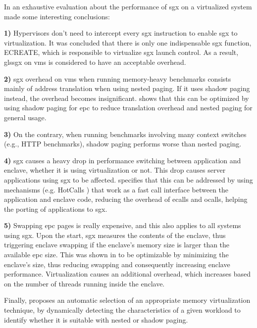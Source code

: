 In \cite{sgxVirtualizationPaper} an exhaustive evaluation about the performance of \gls{sgx} on a virtualized system made some interesting conclusions:

\textbf{1)} Hypervisors don't need to intercept every \gls{sgx} instruction to enable \gls{sgx} to virtualization. It was concluded that there is only one indispensable \gls{sgx} function, ECREATE, which is responsible to virtualize \gls{sgx} launch control. As a result, gls{sgx} on \gls{vm}s is considered to have an acceptable overhead.

\textbf{2)} \gls{sgx} overhead on \gls{vm}s when running memory-heavy benchmarks consists mainly of address translation when using nested paging. If it uses shadow paging instead, the overhead becomes insignificant. 
\cite{sgxVirtualizationPaper} shows that this can be optimized by using shadow paging for \gls{epc} to reduce translation overhead and nested paging for general usage.

\textbf{3)} On the contrary, when running benchmarks involving many context switches (e.g., HTTP benchmarks), shadow paging performs worse than nested paging.

\textbf{4)} \gls{sgx} causes a heavy drop in performance switching between application and enclave, whether it is using virtualization or not. This drop causes server applications using \gls{sgx} to be affected.
\cite{sgxVirtualizationPaper} specifies that this can be addressed by using mechanisms (e.g. HotCalls \cite{hotcallsPaper}) that work as a fast call interface between the application and enclave code, reducing the overhead of ecalls and ocalls, helping the porting of applications to \gls{sgx}.

\textbf{5)} Swapping \gls{epc} pages is really expensive, and this also applies to all systems using \gls{sgx}. 
Upon the start, \gls{sgx} measures the contents of the enclave, thus triggering enclave swapping if the enclave's memory size is larger than the available \gls{epc} size. 
This was shown in \cite{sgxVirtualizationPaper} to be optimizable by minimizing the enclave's size, thus reducing swapping and consequently increasing enclave performance.
Virtualization causes an additional overhead, which increases based on the number of threads running inside the enclave.

Finally, \cite{sgxVirtualizationPaper} proposes an automatic selection of an appropriate memory virtualization technique, by dynamically detecting the characteristics of a given workload to identify whether it is suitable with nested or shadow paging.\newline

